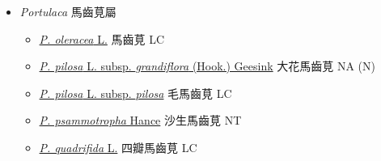 
  \begin{itemize}
 \item[] \textit{Portulaca} 馬齒莧屬
                                
  \begin{itemize}
        \item[] \href{http://www.theplantlist.org/tpl1.1/search?q=Portulaca+oleracea}{\textit{P. oleracea} L.}   馬齒莧   LC
        \item[] \href{http://www.theplantlist.org/tpl1.1/search?q=Portulaca+pilosa+subsp.+grandiflora}{\textit{P. pilosa} L. subsp. \textit{grandiflora} (Hook.) Geesink}   大花馬齒莧   NA (N)
        \item[] \href{http://www.theplantlist.org/tpl1.1/search?q=Portulaca+pilosa+subsp.+pilosa}{\textit{P. pilosa} L. subsp. \textit{pilosa}}   毛馬齒莧   LC
        \item[] \href{http://www.theplantlist.org/tpl1.1/search?q=Portulaca+psammotropha}{\textit{P. psammotropha} Hance}   沙生馬齒莧   NT
        \item[] \href{http://www.theplantlist.org/tpl1.1/search?q=Portulaca+quadrifida}{\textit{P. quadrifida} L.}   四瓣馬齒莧   LC
  \end{itemize}
  \end{itemize}
